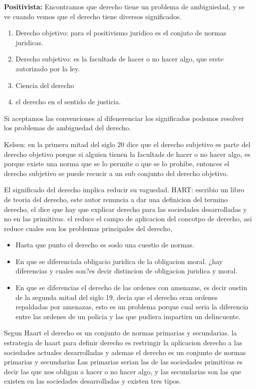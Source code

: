 \documentclass[12pt]{book}
\begin{document}
\textbf{Positivista: }Encontramos que derecho tiene un problema de ambiguiedad, y se ve cuando vemos que el derecho tiene diversos significados.

\begin{enumerate}

\item Derecho objetivo: para el positivismo juridico es el conjuto  de normas juridicas.
\item Derecho subjetivo: es la facultads de hacer o no hacer algo, que erste autorizado por la ley.
\item  Ciencia del derecho
\item el derecho en el sentido de justicia.

\end{enumerate}


Si aceptamos las convenciones al difenerenciar los significados podemos resolver los problemas de ambiguedad del derecho.

Kelsen: en la primera mitad del siglo 20 dice que el derecho subjetivo es parte del derecho objetivo porque si alguien tienen la facultads de hacer o no hacer algo, es porque existe una norma que se lo permite o que se lo prohibe, entonces el derecho subjetivo se puede recucir a un sub conjunto del derecho objetivo.

El significado del derecho implica reducir su vaguedad.
HART: escribio un  libro de teoria del derecho, este autor renuncia a dar una definicion del termino derecho, el dice que hay que explicar derecho para las sociedades desarrolladas y no en las primitivas.
el reduce el campo de aplicacion del concotpo de derecho, asi reduce cuales son los problemas principales del derecho,

\begin{itemize}
\item Hasta que punto el derecho es soslo una cuestio de normas.
\item En que se diferenciala obligacio juridica de la obligacion moral. ¿hay diferencias y cuales son?es decir distincion de obligacion juridica y moral.
\item En que se diferencias el derecho de las ordenes con amenazas, es decir oustin de la segunda mitad del siglo 19, decia que el derecho eran ordenes repaldadas por amenazas, esto es un problema porque cual seria la diferencia entre las ordenes de un policia y las que pudiera impartirn un delincuente.
\end{itemize}

Segun Haart el derecho es un conjunto de normas primarias y secundarias.
la estrategia de haart para definir derecho es restringir la aplicacion derecho a las sociedades actuales desarrolladas y ademas el derecho es un conjunto de normas primarias y secundarias
Las primarias serian las de las sociedades primitivas es decir las que nos obligan a hacer o no hacer algo, y las secundarias son las que existen en las sociedades desarrolladas y existen tres tipos.
\end{document}
